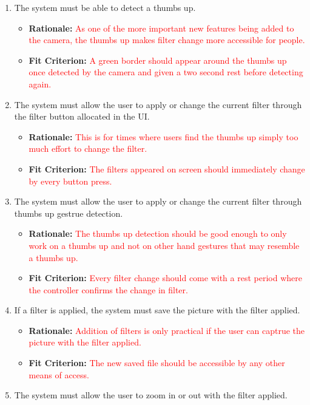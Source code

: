 \documentclass[12pt, titlepage]{article}
\begin{document}
{\begin{enumerate}[{REQ}1.]
\item The system must be able to detect a thumbs up. 
	\begin{itemize}
		\item \textbf{Rationale:}  \textcolor{red}{As one of the more important new features being added to the camera, the thumbs up makes filter change more accessible for people.}
		\item \textbf{Fit Criterion:}   \textcolor{red}{A green border should appear around the thumbs up once detected by the camera and given a two second rest before detecting again. }
	\end{itemize}
\item The system must allow the user to apply or change the current filter through the filter button allocated in the UI. 
	\begin{itemize}
		\item \textbf{Rationale:}  \textcolor{red}{This is for times where users find the thumbs up simply too much effort to change the filter.}
		\item \textbf{Fit Criterion:}   \textcolor{red}{The filters appeared on screen should immediately change by every button press.}
	\end{itemize}
\item The system must allow the user to apply or change the current filter through thumbs up gestrue detection.
	\begin{itemize}
		\item \textbf{Rationale:}  \textcolor{red}{The thumbs up detection should be good enough to only work on a thumbs up and not on other hand gestures that may resemble a thumbs up. }
		\item \textbf{Fit Criterion:}   \textcolor{red}{Every filter change should come with a rest period where the controller confirms the change in filter.}
	\end{itemize}
\item If a filter is applied, the system must save the picture with the filter applied. 
	\begin{itemize}
		\item \textbf{Rationale:}  \textcolor{red}{Addition of filters is only practical if the user can captrue the picture with the filter applied.}
		\item \textbf{Fit Criterion:}   \textcolor{red}{The new saved file should be accessible by any other means of access.}
	\end{itemize}
\item The system must allow the user to zoom in or out with the filter applied.

\end{enumerate}}
\end{document}
